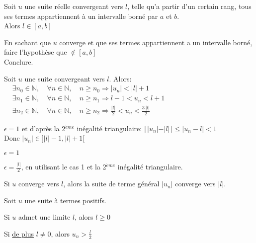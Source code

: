 \documentclass[12pt,twoside,a4paper]{article}
\begin{document}
			\begin{prop}
				Soit $u$ une suite r\'eelle convergeant vers $l$, telle qu'a partir d'un certain rang, tous ses termes appartiennent \`a un intervalle born\'e par $a$ et $b$.\\
				Alors $l\in[a,b]$
			\end{prop}
			\begin{preuve}
				En sachant que $u$ converge et que ses termes appartiennent a un intervalle born\'e, faire l'hypoth\`ese que $\notin[a,b]$\\
				Conclure.
			\end{preuve}
			\begin{prop}
				Soit $u$ une suite convergeant vers $l$. Alors:\\
				$\begin{aligned}
					&\exists n_0\in\mathbb{N},&\ \forall n\in\mathbb{N},&\ n\geqslant n_0\Rightarrow |u_n|<|l|+1\\
					&\exists n_1\in\mathbb{N},&\ \forall n\in\mathbb{N},&\ n\geqslant n_1\Rightarrow l-1<u_n<l+1\\
					&\exists n_2\in\mathbb{N},&\ \forall n\in\mathbb{N},&\ n\geqslant n_2\Rightarrow \frac{|l|}{2}<u_n<\frac{3\,|l|}{2}
				\end{aligned}$
			\end{prop}
			\begin{preuve}
				\begin{liste}
					\item $\epsilon=1$ et d'apr\`es la 2$^{\grave{e}me}$ in\'egalit\'e triangulaire: $|\,|u_n|-|l|\,|\leqslant|u_n-l|<1$\\
						Donc $|u_n|\in]|l|-1,|l|+1[$
					\item $\epsilon = 1$
					\item $\epsilon = \frac{|l|}{2}$, en utilisant le cas 1 et la 2$^{\grave{e}me}$ in\'egalit\'e triangulaire.
				\end{liste}
			\end{preuve}
			\begin{prop}
				Si $u$ converge vers $l$, alors la suite de terme g\'en\'eral $|u_n|$ converge vers $|l|$.
			\end{prop}
			\begin{prop}
				Soit $u$ une suite \`a termes positifs.
				\begin{liste}
					\item Si $u$ admet une limite $l$, alors $l\geqslant0$
					\item Si \underline{de plus} $l\neq0$, alors $u_n>\frac{l}{2}$
				\end{liste}
			\end{prop}
\end{document}
